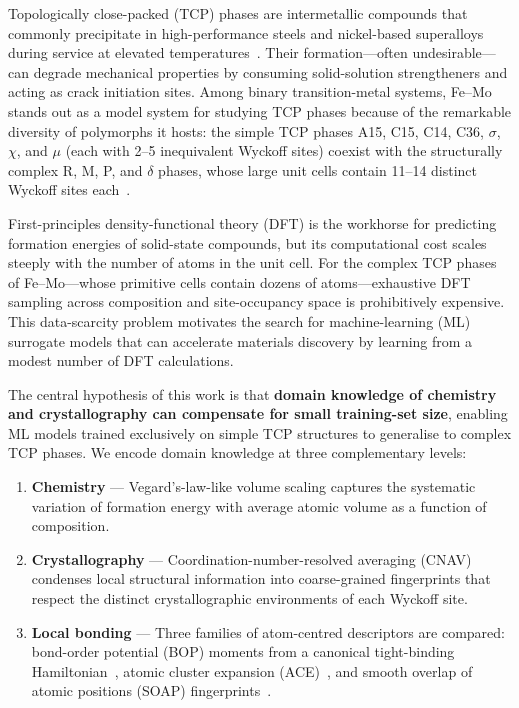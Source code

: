 
Topologically close-packed (TCP) phases are intermetallic compounds that commonly precipitate in high-performance steels and nickel-based superalloys during service at elevated temperatures~\cite{smith_tcp, joubert_tcp}. Their formation---often undesirable---can degrade mechanical properties by consuming solid-solution strengtheners and acting as crack initiation sites. Among binary transition-metal systems, Fe--Mo stands out as a model system for studying TCP phases because of the remarkable diversity of polymorphs it hosts: the simple TCP phases A15, C15, C14, C36, $\sigma$, $\chi$, and $\mu$ (each with 2--5 inequivalent Wyckoff sites) coexist with the structurally complex R, M, P, and $\delta$ phases, whose large unit cells contain 11--14 distinct Wyckoff sites each~\cite{crivello_tcp, joubert_fe_mo}.

First-principles density-functional theory (DFT) is the workhorse for predicting formation energies of solid-state compounds, but its computational cost scales steeply with the number of atoms in the unit cell. For the complex TCP phases of Fe--Mo---whose primitive cells contain dozens of atoms---exhaustive DFT sampling across composition and site-occupancy space is prohibitively expensive. This data-scarcity problem motivates the search for machine-learning (ML) surrogate models that can accelerate materials discovery by learning from a modest number of DFT calculations.

The central hypothesis of this work is that \textbf{domain knowledge of chemistry and crystallography can compensate for small training-set size}, enabling ML models trained exclusively on simple TCP structures to generalise to complex TCP phases. We encode domain knowledge at three complementary levels:

\begin{enumerate}
  \item \textbf{Chemistry} --- Vegard's-law-like volume scaling captures the systematic variation of formation energy with average atomic volume as a function of composition.
  \item \textbf{Crystallography} --- Coordination-number-resolved averaging (CNAV) condenses local structural information into coarse-grained fingerprints that respect the distinct crystallographic environments of each Wyckoff site.
  \item \textbf{Local bonding} --- Three families of atom-centred descriptors are compared: bond-order potential (BOP) moments from a canonical tight-binding Hamiltonian~\cite{bopfox}, atomic cluster expansion (ACE)~\cite{ace}, and smooth overlap of atomic positions (SOAP) fingerprints~\cite{soap}.
\end{enumerate}

